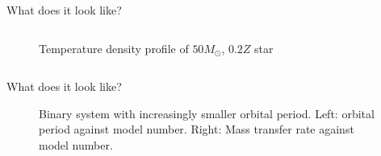 \documentclass{beamer}
\begin{document}
\begin{frame}{What does it look like?}
\begin{columns}
\begin{column}{0.5\textwidth}
\begin{center}
\begin{figure}
                    \caption{Temperature density profile of $50M_\odot$, $0.2Z$ star}
                \end{figure}
            \end{center}
        \end{column}
    \end{columns}      
\end{frame}

\begin{frame}{What does it look like?}
    \begin{center}
        \begin{figure}
            \caption{Binary system with increasingly smaller orbital period. Left: orbital period against model number. Right: Mass transfer rate against model number.}
        \end{figure}
    \end{center}
\end{frame}
\end{document}
